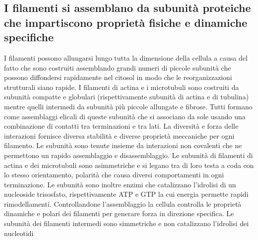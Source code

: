 \subsection{I filamenti si assemblano da subunit\`a proteiche che impartiscono propriet\`a fisiche e dinamiche specifiche}
I filamenti possono allungarsi lungo tutta la dimensione della cellula a causa del fatto che sono costruiti assemblando grandi numeri di piccole subunit\`a che possono diffondersi
rapidamente nel citosol in modo che le reorganizzazioni strutturali siano rapide. I filamenti di actina e i microtubuli sono costruiti da subunit\`a compatte e globulari (rispettivamente
subunit\`a di actina e di tubulina) mentre quelli intermedi da subunit\`a pi\`u piccole allungate e fibrose. Tutti formano come assemblaggi elicali di queste subunit\`a che si associano
da sole usando una combinazione di contatti tra terminazioni e tra lati. La diversit\`a e forza delle interazioni fornisce diversa stabilit\`a e diverse propriet\`a meccaniche per ogni
filamento. Le subunit\`a sono tenute insieme da interazioni non covalenti che ne permettono un rapido assemblaggio e disassemblaggio. Le subunit\`a di filamenti di actina e dei 
microtubuli sono asimmetriche e si legano tra di loro testa a coda con lo stesso orientamento, polarit\`a che causa diversi comportamenti in ogni terminazione. Le subunit\`a sono inoltre
enzimi che catalizzano l'idrolisi di un nucleoside trisosfato, rispettivamente ATP e GTP la cui energia permette rapidi rimodellamenti. Controllandone l'assemblaggio la cellula controlla
le propriet\`a dinamiche e polari dei filamenti per generare forza in direzione specifica. Le subunit\`a dei filamenti intermedi sono simmetriche e non catalizzano l'idrolisi dei 
nucleotidi
